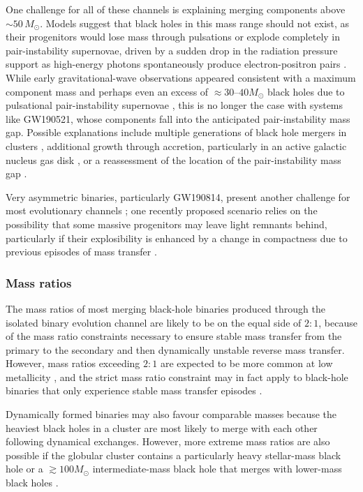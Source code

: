 \documentclass[review]{elsarticle}
\begin{document}
One challenge for all of these channels is explaining merging components above $\sim 50\, M_\odot$.  Models suggest that black holes in this mass range should not exist, as their progenitors would lose mass through pulsations or explode completely in pair-instability supernovae, driven by a sudden drop in the radiation pressure support as high-energy photons spontaneously produce electron-positron pairs  \citep[e.g.,][]{Woosley:2017,Farmer:2019}.  While early gravitational-wave observations appeared consistent with a maximum component mass and perhaps even an excess of $\approx 30$--$40 M_\odot$ black holes due to pulsational pair-instability supernovae \citep[e.g.,][]{Stevenson:2019}, this is no longer the case with systems like GW190521, whose components fall into the anticipated pair-instability mass gap.  Possible explanations \citep{GW190521:astro} include multiple generations of black hole mergers in clusters \citep[e.g.,][]{Rodriguez:2019,Anagnostou:2020}, additional growth through accretion, particularly in an active galactic nucleus gas disk \citep[e.g.,][]{GerosaFishbach:2021,Tagawa:2021}, or a reassessment of the location of the pair-instability mass gap \citep{Belczynski:2020massgap}.

Very asymmetric binaries, particularly GW190814, present another challenge for most evolutionary channels \citep{Zevin:2020,Mandel:2020}; one recently proposed scenario relies on the possibility that some massive progenitors may leave light remnants behind, particularly if their explosibility is enhanced by a change in compactness due to previous episodes of mass transfer \citep{Antoniadis:2021}.  

\subsubsection{Mass ratios}
The mass ratios of most merging black-hole binaries produced through the isolated binary evolution channel are likely to be on the equal side of $2:1$, because of the mass ratio constraints necessary to ensure stable mass transfer from the primary to the secondary and then dynamically unstable reverse mass transfer.   However, mass ratios exceeding $2:1$ are expected to be more common at low metallicity \citep{Dominik:2012,Stevenson:2017}, and the strict mass ratio constraint may in fact apply to black-hole binaries that only experience stable mass transfer episodes \citep{vanSon:2021}.

Dynamically formed binaries may also favour comparable masses because the heaviest black holes in a cluster are most likely to merge with each other following dynamical exchanges.  However, more extreme mass ratios are also possible if the globular cluster contains a particularly heavy stellar-mass black hole or a $\gtrsim 100 M_\odot$ intermediate-mass black hole that merges with lower-mass black holes \citep{Mandel:2008,Belczynski:2014VMS}. 
\end{document}
